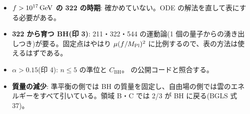 \begin{caveat}
\begin{itemize}
\item \textbf{$f>10^{17}\,\mathrm{GeV}$ の 322 の時期}: 確かめていない。ODE の解法を直して表にする必要がある。
\item \textbf{322 から育つ BH(印 3)}: 211・322・544 の運動論(1 個の量子からの湧き出しつき)が要る。固定点はやはり $\mu(f/M_\mathrm{Pl})^2$ に比例するので、表の方法は使えるはずである。
\item \textbf{$\alpha>0.15$}(印 4): $n\le5$ の準位と $C_\mathrm{BH}$。 の公開コードと照合する。
\item \textbf{質量の減少}: 準平衡の側では BH の質量を固定し、自由場の側では雲のエネルギーをすべて引いている。領域 B・C では 2/3 が BH に戻る(BGLS 式 37)。
\end{itemize}
\end{caveat}
